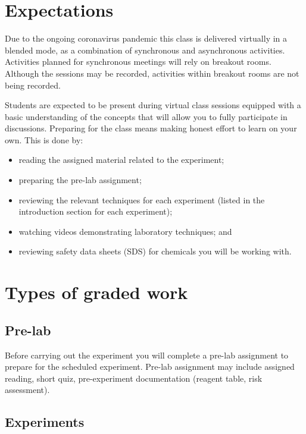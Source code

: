 \hypertarget{sec:expectations}{%
\section{Expectations}\label{sec:expectations}}

Due to the ongoing coronavirus pandemic this class is delivered
virtually in a blended mode, as a combination of synchronous and
asynchronous activities. Activities planned for synchronous meetings
will rely on breakout rooms. Although the sessions may be recorded,
activities within breakout rooms are not being recorded.

Students are expected to be present during virtual class sessions
equipped with a basic understanding of the concepts that will allow you
to fully participate in discussions. Preparing for the class means
making honest effort to learn on your own. This is done by:

\begin{itemize}
\tightlist
\item
  reading the assigned material related to the experiment;
\item
  preparing the pre-lab assignment;
\item
  reviewing the relevant techniques for each experiment (listed in the
  introduction section for each experiment);
\item
  watching videos demonstrating laboratory techniques; and
\item
  reviewing safety data sheets (SDS) for chemicals you will be working
  with.
\end{itemize}

\hypertarget{sec:types-of-graded-work}{%
\section{Types of graded work}\label{sec:types-of-graded-work}}

\hypertarget{sec:pre-lab}{%
\subsection{Pre-lab}\label{sec:pre-lab}}

Before carrying out the experiment you will complete a pre-lab
assignment to prepare for the scheduled experiment. Pre-lab assignment
may include assigned reading, short quiz, pre-experiment documentation
(reagent table, risk assessment).

\hypertarget{sec:experiments}{%
\subsection{Experiments}\label{sec:experiments}}

